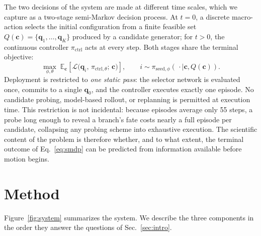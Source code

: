 \documentclass{svproc}
\begin{document}
The two decisions of the system are made at different time scales, which we
capture as a two-stage semi-Markov decision process. At $t{=}0$, a discrete
macro-action selects the initial configuration from a finite feasible set
$Q(\mathbf{c})=\{\mathbf{q}_{1},\dots,\mathbf{q}_{K}\}$ produced by a
candidate generator; for $t{>}0$, the continuous controller
$\pi_{\mathrm{ctrl}}$ acts at every step. Both stages share the terminal
objective:
\begin{equation}
\label{eq:smdp}
\max_{\phi,\theta}\;
\mathbb{E}_{\mathbf{c}}\!\left[
\mathcal{L}\big(\mathbf{q}_{i},\,\pi_{\mathrm{ctrl},\theta};\,\mathbf{c}\big)
\right],
\qquad i \sim \pi_{\mathrm{seed},\phi}(\,\cdot\mid \mathbf{c}, Q(\mathbf{c})).
\end{equation}
Deployment is restricted to \textit{one static pass}: the selector network is
evaluated once, commits to a single $\mathbf{q}_{0}$, and the controller
executes exactly one episode. No candidate probing, model-based rollout, or
replanning is permitted at execution time. This restriction is not incidental:
because episodes average only 55 steps, a probe long enough to reveal a
branch's fate costs nearly a full episode per candidate, collapsing any
probing scheme into exhaustive execution. The scientific content of the
problem is therefore whether, and to what extent, the terminal outcome of
Eq.~\eqref{eq:smdp} can be predicted from information available before motion
begins.

\section{Method}
\label{sec:method}
Figure~\ref{fig:system} summarizes the system. We describe the three
components in the order they answer the questions of
Sec.~\ref{sec:intro}.
\end{document}
